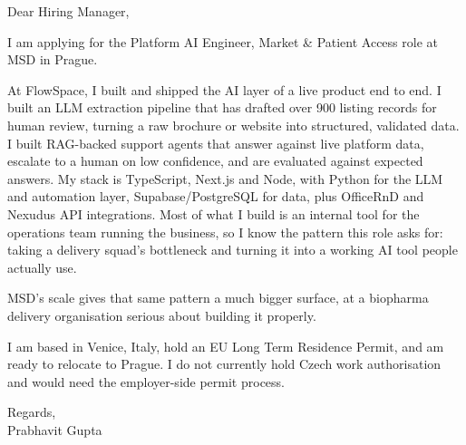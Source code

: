 \documentclass[a4paper,11pt]{article}
\begin{document}
Dear Hiring Manager,

I am applying for the Platform AI Engineer, Market \& Patient Access role at MSD in Prague.

At FlowSpace, I built and shipped the AI layer of a live product end to end. I built an LLM extraction pipeline that has drafted over 900 listing records for human review, turning a raw brochure or website into structured, validated data. I built RAG-backed support agents that answer against live platform data, escalate to a human on low confidence, and are evaluated against expected answers. My stack is TypeScript, Next.js and Node, with Python for the LLM and automation layer, Supabase/PostgreSQL for data, plus OfficeRnD and Nexudus API integrations. Most of what I build is an internal tool for the operations team running the business, so I know the pattern this role asks for: taking a delivery squad's bottleneck and turning it into a working AI tool people actually use.

MSD's scale gives that same pattern a much bigger surface, at a biopharma delivery organisation serious about building it properly.

I am based in Venice, Italy, hold an EU Long Term Residence Permit, and am ready to relocate to Prague. I do not currently hold Czech work authorisation and would need the employer-side permit process.

Regards,\\
Prabhavit Gupta
\end{document}
